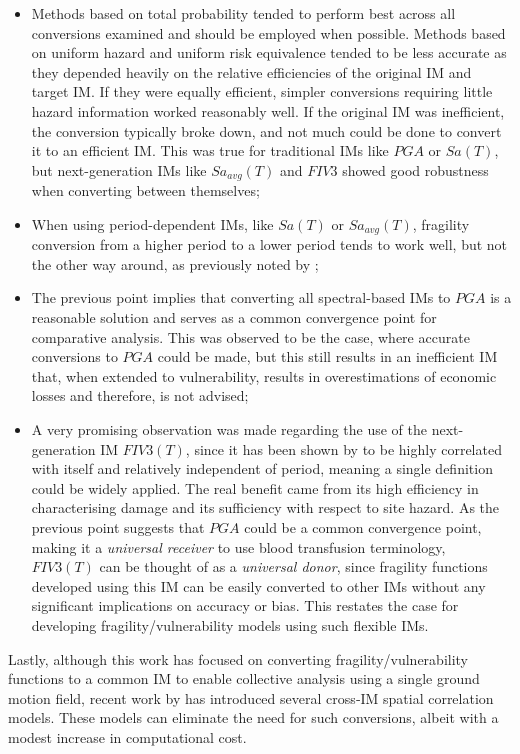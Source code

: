 \begin{itemize}
    \item Methods based on total probability tended to perform best across all conversions examined and should be employed when possible. Methods based on uniform hazard and uniform risk equivalence tended to be less accurate as they depended heavily on the relative efficiencies of the original IM and target IM. If they were equally efficient, simpler conversions requiring little hazard information worked reasonably well. If the original IM was inefficient, the conversion typically broke down, and not much could be done to convert it to an efficient IM. This was true for traditional IMs like $PGA$ or $Sa(T)$, but next-generation IMs like $Sa_{avg}(T)$ and $FIV3$ showed good robustness when converting between themselves;
    
    \item When using period-dependent IMs, like $Sa(T)$ or $Sa_{avg}(T)$, fragility conversion from a higher period to a lower period tends to work well, but not the other way around, as previously noted by \citet{Suzuki2020};

    \item The previous point implies that converting all spectral-based IMs to $PGA$ is a reasonable solution and serves as a common convergence point for comparative analysis. This was observed to be the case, where accurate conversions to $PGA$ could be made, but this still results in an inefficient IM that, when extended to vulnerability, results in overestimations of economic losses and therefore, is not advised;

    \item A very promising observation was made regarding the use of the next-generation IM $FIV3(T)$, since it has been shown by \citet{Aristeidou2025} to be highly correlated with itself and relatively independent of period, meaning a single definition could be widely applied. The real benefit came from its high efficiency in characterising damage and its sufficiency with respect to site hazard. As the previous point suggests that $PGA$ could be a common convergence point, making it a \textit{universal receiver} to use blood transfusion terminology, $FIV3(T)$ can be thought of as a \textit{universal donor}, since fragility functions developed using this IM can be easily converted to other IMs without any significant implications on accuracy or bias. This restates the case for developing fragility/vulnerability models using such flexible IMs.
\end{itemize}

Lastly, although this work has focused on converting fragility/vulnerability functions to a common \ac{IM} to enable collective analysis using a single ground motion field, recent work by \citet{Monteiro2026b} has introduced several cross‐\ac{IM} spatial correlation models. These models can eliminate the need for such conversions, albeit with a modest increase in computational cost.